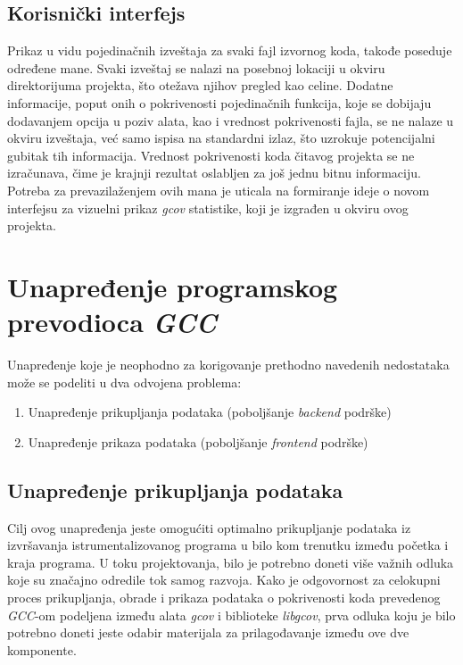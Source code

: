 \documentclass[12pt,oneside]{memoir}
\newcommand{\strano}[1]{\textit{#1}}
\begin{document}
\subsection{Korisnički interfejs}


Prikaz u vidu pojedinačnih izveštaja za svaki fajl izvornog koda, takođe poseduje određene mane. Svaki izveštaj se nalazi na posebnoj lokaciji u okviru direktorijuma projekta, što otežava njihov pregled kao celine. Dodatne informacije, poput onih o pokrivenosti pojedinačnih funkcija, koje se dobijaju dodavanjem opcija u poziv alata, kao i vrednost pokrivenosti fajla, se ne nalaze u okviru izveštaja, već samo ispisa na standardni izlaz, što uzrokuje potencijalni gubitak tih informacija. Vrednost pokrivenosti koda čitavog projekta se ne izračunava, čime je krajnji rezultat oslabljen za još jednu bitnu informaciju. Potreba za prevazilaženjem ovih mana je uticala na formiranje ideje o novom interfejsu za vizuelni prikaz \strano{gcov} statistike, koji je izgrađen u okviru ovog projekta. 


\section{Unapređenje programskog prevodioca \strano{GCC}}


Unapređenje koje je neophodno za korigovanje prethodno navedenih nedostataka može se podeliti u dva odvojena problema:
\begin{enumerate}
\item Unapređenje prikupljanja podataka (poboljšanje \strano{backend} podrške)
\item Unapređenje prikaza podataka (poboljšanje \strano{frontend} podrške)
\end{enumerate}


\subsection{Unapređenje prikupljanja podataka}

Cilj ovog unapređenja jeste omogućiti optimalno prikupljanje podataka iz izvršavanja istrumentalizovanog programa u bilo kom trenutku između početka i kraja programa. U toku projektovanja, bilo je potrebno doneti više važnih odluka koje su značajno odredile tok samog razvoja. Kako je odgovornost za celokupni proces prikupljanja, obrade i prikaza podataka o pokrivenosti koda prevedenog \strano{GCC}-om podeljena između alata \strano{gcov} i biblioteke \strano{libgcov}, prva odluka koju je bilo potrebno doneti jeste odabir materijala za prilagođavanje između ove dve komponente.
\end{document}
